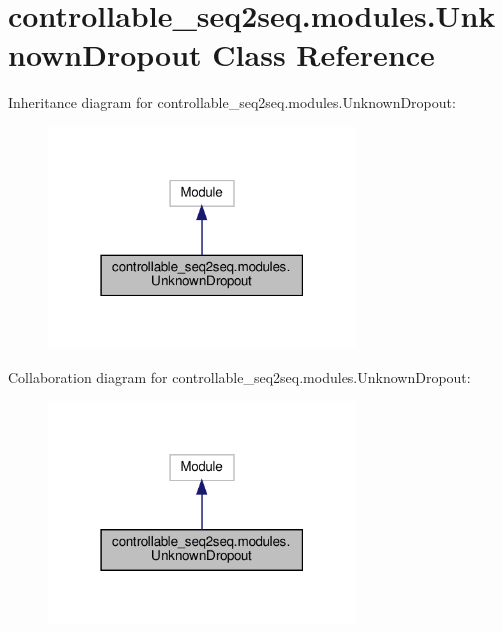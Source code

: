 \hypertarget{classcontrollable__seq2seq_1_1modules_1_1UnknownDropout}{}\section{controllable\+\_\+seq2seq.\+modules.\+Unknown\+Dropout Class Reference}
\label{classcontrollable__seq2seq_1_1modules_1_1UnknownDropout}


Inheritance diagram for controllable\+\_\+seq2seq.\+modules.\+Unknown\+Dropout\+:
\nopagebreak
\begin{figure}[H]
\begin{center}
\leavevmode
\includegraphics[width=231pt]{classcontrollable__seq2seq_1_1modules_1_1UnknownDropout__inherit__graph}
\end{center}
\end{figure}


Collaboration diagram for controllable\+\_\+seq2seq.\+modules.\+Unknown\+Dropout\+:
\nopagebreak
\begin{figure}[H]
\begin{center}
\leavevmode
\includegraphics[width=231pt]{classcontrollable__seq2seq_1_1modules_1_1UnknownDropout__coll__graph}
\end{center}
\end{figure}
